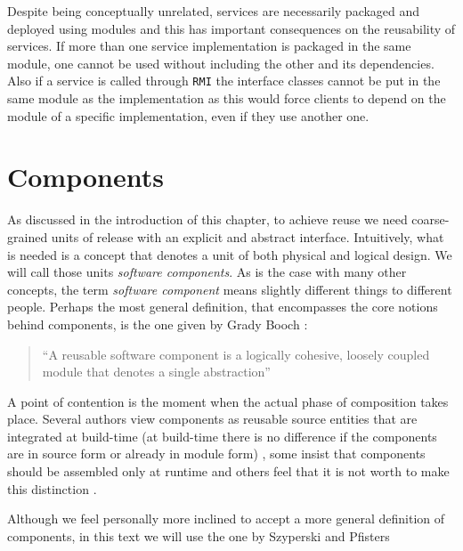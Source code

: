 Despite being conceptually unrelated, services are necessarily packaged and deployed using modules and this has important consequences on the
reusability of services. If more than one service implementation is packaged in the same module, one cannot be used without including the other
and its dependencies. Also if a service is called through \texttt{RMI} the interface classes cannot be put in the same module as the implementation
as this would force clients to depend on the module of a specific implementation, even if they use another one.


\section{Components}
\label{sec:components}

As discussed in the introduction of this chapter, to achieve reuse we need coarse-grained units of release with an
explicit and abstract interface. Intuitively, what is needed is a concept that denotes a unit of both physical and
logical design. We will call those units \emph{software components}. As is the case with many other concepts,
the term \emph{software component} means slightly different things to different people. Perhaps the most general
definition, that encompasses the core notions behind components, is the one given by Grady Booch \cite{Booch87}:

\begin{quotation}
``A reusable software component is a logically cohesive, loosely coupled module that denotes a single abstraction''
\end{quotation}

A point of contention is the moment when the actual phase of composition takes place. Several authors view components as reusable source entities that
are integrated at build-time (at build-time there is no difference if the components are in source form or already in module form) \cite{Lakos}, some
insist that components should be assembled only at runtime \cite{Szyperski} \cite{Heineman} and others feel that it is not worth to make this distinction
\cite{Czarnecki00} \cite{Sametinger}.

Although we feel personally more inclined to accept a more general definition of components, in this text we will use the one by Szyperski and Pfisters \cite{WCOP97}

